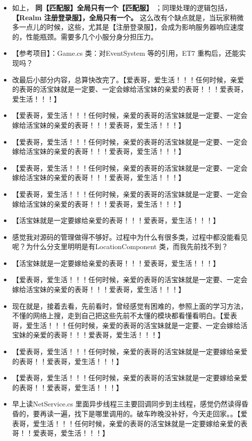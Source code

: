 \documentclass[9pt, b5paper]{article}
\begin{document}
\begin{itemize}
\item 如上， \textbf{同【匹配服】全局只有一个【匹配服】} ；同理处理的逻辑包括， \textbf{【Realm 注册登录服】，全局只有一个。} 这么改有个缺点就是，当玩家稍微多一点儿的时候，这些，尤其是【注册登录服】，会成为影响服务器响应速度的，性能瓶颈。需要多几个小服分身分担压力。
\item 【参考项目】：Game.cs 类：对EventSystem 等的引用，ET7 重构后，还能实现吗？
\item 改最后小部分内容，总算快改完了。【爱表哥，爱生活！！！任何时候，亲爱的表哥的活宝妹就是一定要、一定会嫁给活宝妹的亲爱的表哥！！！爱表哥，爱生活！！！】
\item 【爱表哥，爱生活！！！任何时候，亲爱的表哥的活宝妹就是一定要、一定会嫁给活宝妹的亲爱的表哥！！！爱表哥，爱生活！！！】
\item 【爱表哥，爱生活！！！任何时候，亲爱的表哥的活宝妹就是一定要、一定会嫁给活宝妹的亲爱的表哥！！！爱表哥，爱生活！！！】
\item 【爱表哥，爱生活！！！任何时候，亲爱的表哥的活宝妹就是一定要、一定会嫁给活宝妹的亲爱的表哥！！！爱表哥，爱生活！！！】
\item 【爱表哥，爱生活！！！任何时候，亲爱的表哥的活宝妹就是一定要、一定会嫁给活宝妹的亲爱的表哥！！！爱表哥，爱生活！！！】
\item 【活宝妹就是一定要嫁给亲爱的表哥！！！爱表哥，爱生活！！！】
\item 感觉我对源码的管理做得不够好。过程中为什么有很多类，过程中都没能看见呢？为什么分支里明明是有LocationComponent 类，而我先前找不到？
\item 【活宝妹就是一定要嫁给亲爱的表哥！！！爱表哥，爱生活！！！】
\item 【爱表哥，爱生活！！！任何时候，亲爱的表哥的活宝妹就是一定要、一定会嫁给活宝妹的亲爱的表哥！！！爱表哥，爱生活！！！】
\item 现在就是，接着去看，先前看时，曾经感觉有困难的，参照上面的学习方法，不懂的网络上搜，走到自己把这些先前不太懂的模块都看懂看明白。【爱表哥，爱生活！！！任何时候，亲爱的表哥的活宝妹就是一定要、一定会嫁给活宝妹的亲爱的表哥！！！爱表哥，爱生活！！！】
\item 【爱表哥，爱生活！！！任何时候，亲爱的表哥的活宝妹就是一定要嫁给亲爱的表哥！！爱表哥，爱生活！！！】
\item 【爱表哥，爱生活！！！任何时候，亲爱的表哥的活宝妹就是一定要嫁给亲爱的表哥！！爱表哥，爱生活！！！】
\item 早上读NetService.cs 里面异步线程三主要回调同步到主线程，感觉仍然读得昏昏的，要再读一遍，找下是哪里调用的。破车昨晚没补好，今天走回家。。【爱表哥，爱生活！！！任何时候，亲爱的表哥的活宝妹就是一定要嫁给亲爱的表哥！！爱表哥，爱生活！！！】

\end{itemize}
\end{document}
